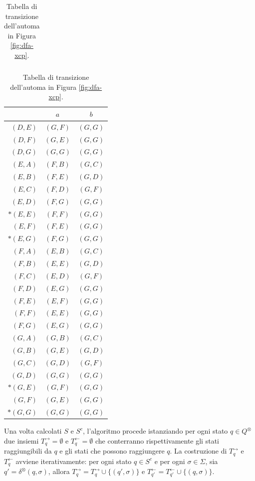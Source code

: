 \documentclass[a4paper,12pt,twoside, openright]{report} %
\begin{document}
\begin{table}[!htb]
\begin{tabular}[t]{r|c|c}
  \end{tabular}
  \quad
  \begin{tabular}[t]{r|c|c}
    \toprule
              & $a$       & $b$       \\
    \midrule
    $(D, E)$  & $(G, F)$  & $(G, G)$  \\
    $(D, F)$  & $(G, E)$  & $(G, G)$  \\
    $(D, G)$  & $(G, G)$  & $(G, G)$  \\
    $(E, A)$  & $(F, B)$  & $(G, C)$  \\
    $(E, B)$  & $(F, E)$  & $(G, D)$  \\
    $(E, C)$  & $(F, D)$  & $(G, F)$  \\
    $(E, D)$  & $(F, G)$  & $(G, G)$  \\
    $*(E, E)$ & $(F, F)$  & $(G, G)$  \\
    $(E, F)$  & $(F, E)$  & $(G, G)$  \\
    $*(E, G)$ & $(F, G)$  & $(G, G)$  \\
    $(F, A)$  & $(E, B)$  & $(G, C)$  \\
    $(F, B)$  & $(E, E)$  & $(G, D)$  \\
    $(F, C)$  & $(E, D)$  & $(G, F)$  \\
    $(F, D)$  & $(E, G)$  & $(G, G)$  \\
    $(F, E)$  & $(E, F)$  & $(G, G)$  \\
    $(F, F)$  & $(E, E)$  & $(G, G)$  \\
    $(F, G)$  & $(E, G)$  & $(G, G)$  \\
    $(G, A)$  & $(G, B)$  & $(G, C)$  \\
    $(G, B)$  & $(G, E)$  & $(G, D)$  \\
    $(G, C)$  & $(G, D)$  & $(G, F)$  \\
    $(G, D)$  & $(G, G)$  & $(G, G)$  \\
    $*(G, E)$ & $(G, F)$  & $(G, G)$  \\
    $(G, F)$  & $(G, E)$  & $(G, G)$  \\
    $*(G, G)$ & $(G, G)$  & $(G, G)$  \\
    \bottomrule
  \end{tabular}
  \caption{\label{tab:dfa-xcp-transitions}Tabella di transizione dell'automa in Figura \ref{fig:dfa-xcp}.}
\end{table}

Una volta calcolati $S$ e $S^c$, l'algoritmo procede istanziando per ogni stato $q \in Q^\otimes$ due insiemi
$T^\rightarrow_q = \emptyset$ e $T^\leftarrow_q = \emptyset$ che conterranno rispettivamente gli stati raggiungibili
da $q$ e gli stati che possono raggiungere $q$. La costruzione di $T^\rightarrow_q$ e $T^\leftarrow_q$ avviene
iterativamente: per ogni stato $q \in S^c$ e per ogni $\sigma \in \Sigma$, sia $q' = \delta^\otimes(q, \sigma)$,
allora $T^\rightarrow_q = T^\rightarrow_q \cup \{ (q', \sigma) \}$ e 
$T^\leftarrow_{q'} = T^\leftarrow_{q'} \cup \{ (q, \sigma) \}$.
\end{document}
